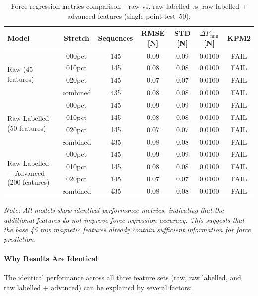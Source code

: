 \documentclass[11pt,a4paper]{article}
\begin{document}
\begin{table}[H]
    \centering
    \caption{Force regression metrics comparison – raw vs. raw labelled vs. raw labelled + advanced features (single-point test~50).}
    \label{tab:force-comparison}
    \begin{tabular}{@{}lcccccc@{}}
        \toprule
        Model & Stretch & Sequences & RMSE [N] & STD [N] & $\Delta F_{\text{min}}$ [N] & KPM2 \\
        \midrule
        \multirow{4}{*}{Raw (45 features)} & 000pct & 145 & 0.09 & 0.09 & 0.0100 & FAIL \\
        & 010pct & 145 & 0.08 & 0.08 & 0.0100 & FAIL \\
        & 020pct & 145 & 0.07 & 0.07 & 0.0100 & FAIL \\
        & combined & 435 & 0.08 & 0.08 & 0.0100 & FAIL \\
        \midrule
        \multirow{4}{*}{Raw Labelled (50 features)} & 000pct & 145 & 0.09 & 0.09 & 0.0100 & FAIL \\
        & 010pct & 145 & 0.08 & 0.08 & 0.0100 & FAIL \\
        & 020pct & 145 & 0.07 & 0.07 & 0.0100 & FAIL \\
        & combined & 435 & 0.08 & 0.08 & 0.0100 & FAIL \\
        \midrule
        \multirow{4}{*}{Raw Labelled + Advanced (200 features)} & 000pct & 145 & 0.09 & 0.09 & 0.0100 & FAIL \\
        & 010pct & 145 & 0.08 & 0.08 & 0.0100 & FAIL \\
        & 020pct & 145 & 0.07 & 0.07 & 0.0100 & FAIL \\
        & combined & 435 & 0.08 & 0.08 & 0.0100 & FAIL \\
        \bottomrule
    \end{tabular}
    \vspace{0.1cm}
    \footnotesize
    \textit{Note: All models show identical performance metrics, indicating that the additional features do not improve force regression accuracy. This suggests that the base 45 raw magnetic features already contain sufficient information for force prediction.}
\end{table}

\paragraph{Why Results Are Identical}
The identical performance across all three feature sets (raw, raw labelled, and raw labelled + advanced) can be explained by several factors:
\end{document}
